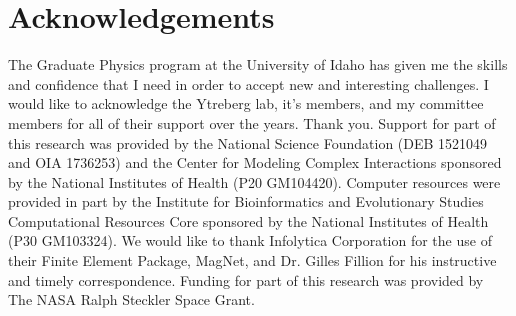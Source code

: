 
\section*{\large{Acknowledgements}}

\begin{flushleft}

The Graduate Physics program at the University of Idaho has given me the skills and
confidence that I need in order to accept new and interesting challenges. I would like to acknowledge the Ytreberg lab, it's members, and my committee members for all of their support over the years. Thank you.
Support for part of this research was provided by the National Science Foundation (DEB 1521049 and OIA 1736253) and the Center for Modeling Complex Interactions sponsored by the National Institutes of Health (P20 GM104420). Computer resources were provided in part by the Institute for Bioinformatics and Evolutionary Studies Computational Resources Core sponsored by the National Institutes of Health (P30 GM103324).
We would like to thank Infolytica Corporation for the use of their Finite Element Package, MagNet, and Dr. Gilles Fillion for his instructive and timely correspondence.  Funding for part of this research was provided by The NASA Ralph Steckler Space Grant.

\end{flushleft}